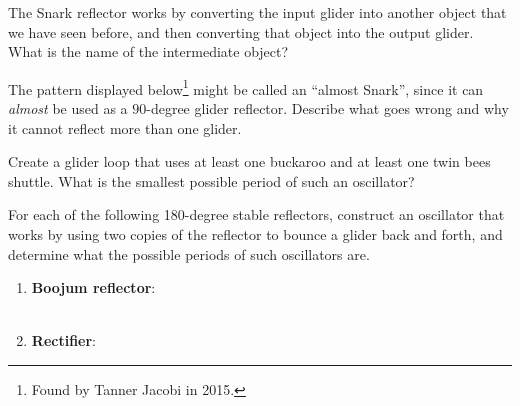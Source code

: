 \begin{multicols}{2}
	
	\mfilbreak
	
	
	\begin{problemstar}\label{exer:snark_creates_honeyfarm} 
		The Snark reflector works by converting the input glider into another object that we have seen before, and then converting that object into the output glider. What is the name of the intermediate object?
	\end{problemstar}
	
	
	\mfilbreak
	
	
	\begin{problemstar}\label{exer:almost_snark} 
		The pattern displayed below\footnote{Found by Tanner Jacobi in 2015.} might be called an ``almost Snark'', since it can \emph{almost} be used as a $90$-degree glider reflector. Describe what goes wrong and why it cannot reflect more than one glider.
		
		\begin{center}
		\end{center}
	\end{problemstar}
	
	
	\mfilbreak
	
	
	\begin{problem}\label{exer:buckaroo_loop} 
		Create a glider loop that uses at least one buckaroo and at least one twin bees shuttle. What is the smallest possible period of such an oscillator? %
	\end{problem}
	
	
	\mfilbreak
	
	
	\begin{problem}\label{exer:new_reflectors} 
		For each of the following 180-degree stable reflectors, construct an oscillator that works by using two copies of the reflector to bounce a glider back and forth, and determine what the possible periods of such oscillators are.\smallskip
		
		\begin{enumerate}[label=\bf\color{ocre}(\alph*)]
			\item \textbf{Boojum reflector}: \\ \\[0.5em]
			
			\item \textbf{Rectifier}: \\ 
		\end{enumerate}
	\end{problem}
	

\end{multicols}
